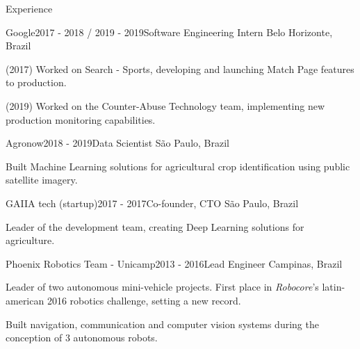 \documentclass[8pt]{resume}
\newcommand{\tit}[1]{\textit{#1}}
\begin{document}
\begin{rSection}{Experience}

\begin{rSubsection}{Google}{2017 - 2018 / 2019 - 2019}{Software Engineering Intern}
    {Belo Horizonte, Brazil}
    \item (2017) Worked on Search - Sports, developing and launching Match Page features to production.
    \item (2019) Worked on the Counter-Abuse Technology team, implementing new production monitoring capabilities.
\end{rSubsection}

\begin{rSubsection}{Agronow}{2018 - 2019}{Data Scientist}
    {São Paulo, Brazil}
\item Built Machine Learning solutions for agricultural crop identification
        using public satellite imagery.
\end{rSubsection}

\begin{rSubsection}{GAIIA tech (startup)}{2017 - 2017}{Co-founder, CTO}
    {São Paulo, Brazil}
    \item Leader of the development team, creating Deep Learning solutions for agriculture.
\end{rSubsection}

\begin{rSubsection}{Phoenix Robotics Team - Unicamp}{2013 - 2016}{Lead Engineer}
    {Campinas, Brazil}
\item Leader of two autonomous mini-vehicle projects.
        First place in \tit{Robocore}'s latin-american 2016 robotics
        challenge, setting a new record.
    \item Built navigation, communication and computer vision systems
        during the conception of 3 autonomous robots.
\end{rSubsection}


\end{rSection}
\end{document}
